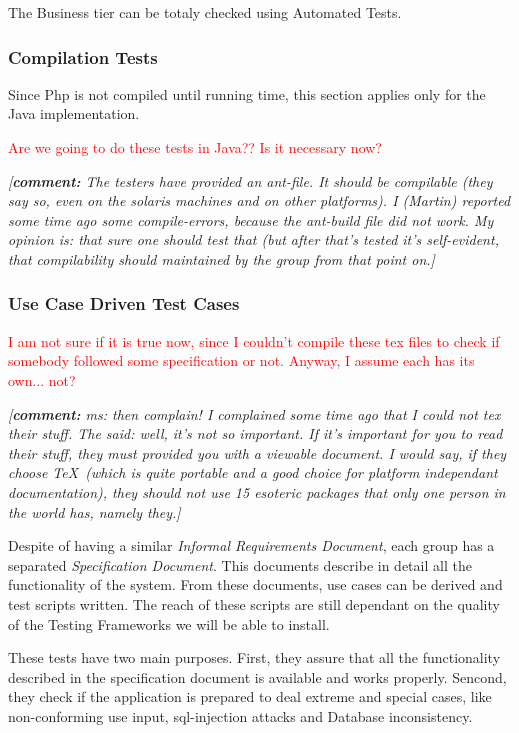 \documentclass[11pt]{article}
\newcommand{\commentary}[1]{\textsl{\small[\textbf{comment:} #1]}}
\begin{document}
\indent

The Business tier can be totaly checked using Automated Tests.

\subsubsection*{Compilation Tests}

\indent

Since Php is not compiled until running time, this section applies only for the Java implementation.

\textcolor{red}{Are we going to do these tests in Java?? Is it necessary now?}

\commentary{The testers have provided an ant-file. It should be compilable
  (they say so, even on the solaris machines and on other platforms). I
  (Martin) reported some time ago some compile-errors, because the
  ant-build file did not work. My opinion is: that sure one should test
  that (but after that's tested it's self-evident, that compilability
  should maintained by the group from that point on.}

\subsubsection*{Use Case Driven Test Cases}

\indent

\textcolor{red}{I am not sure if it is true now, since I couldn't compile
  these tex files to check if somebody followed some specification or not.
  Anyway, I assume each has its own... not?}

\commentary{ms: then complain! I complained some time ago that I could not
  tex their stuff. The said: well, it's not so important. If it's important
  for you to read their stuff, they must provided you with a viewable
  document. I would say, if they choose \TeX\ (which is quite portable and
  a good choice for platform independant documentation), they should not
  use 15 esoteric packages that only one person in the world has, namely
  they.}

Despite of having a similar \textit{Informal Requirements Document}, each
group has a separated {\it Specification Document}. This documents describe
in detail all the functionality of the system. From these documents, use
cases can be derived and test scripts written. The reach of these scripts
are still dependant on the quality of the Testing Frameworks we will be
able to install.

These tests have two main purposes. First, they assure that all the functionality described in the specification document is available and works properly. Sencond, they check if the application is prepared to deal extreme and special cases, like non-conforming use input, sql-injection attacks and Database inconsistency.
\end{document}
